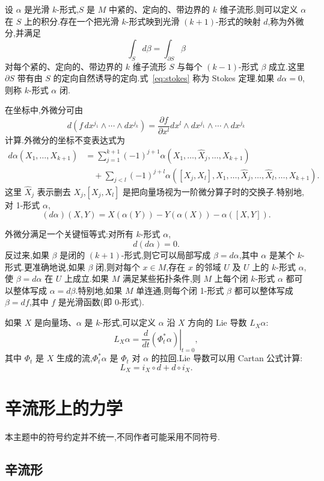 设 $\alpha$ 是光滑 $k$-形式,$S$ 是 $M$ 中紧的、定向的、带边界的 $k$ 维子流形,则可以定义 $\alpha$ 在 $S$ 上的积分.存在一个把光滑 $k$-形式映到光滑 $(k+1)$-形式的映射 $d$,称为外微分,并满足
\[
 \int_Sd\beta=\int_{\partial S}\beta\label{eq:stokes}
\]
对每个紧的、定向的、带边界的 $k$ 维子流形 $S$ 与每个 $(k-1)$-形式 $\beta$ 成立.这里 $\partial S$ 带有由 $S$ 的定向自然诱导的定向.式~\eqref{eq:stokes} 称为 Stokes 定理.如果 $d\alpha=0$,则称 $k$-形式 $\alpha$ 闭.

在坐标中,外微分可由
\[
 d(f\,dx^{j_1}\wedge\cdots\wedge dx^{j_k})
 =\frac{\partial f}{\partial x^l}
 dx^l\wedge dx^{j_1}\wedge\cdots\wedge dx^{j_k}
\]
计算.外微分的坐标不变表达式为
\[
\begin{aligned}
 d\alpha(X_1,\ldots,X_{k+1})
 &=\sum_{j=1}^{k+1}(-1)^{j+1}
 \alpha(X_1,\ldots,\widehat X_j,\ldots,X_{k+1})\\
 &\quad+\sum_{j<l}(-1)^{j+l}
 \alpha([X_j,X_l],X_1,\ldots,\widehat X_j,\ldots,
 \widehat X_l,\ldots,X_{k+1}).
\end{aligned}\label{eq:exterior-derivative}
\]
这里 $\widehat X_j$ 表示删去 $X_j$,$[X_j,X_l]$ 是把向量场视为一阶微分算子时的交换子.特别地,对 1-形式 $\alpha$,
\[
 (d\alpha)(X,Y)=X(\alpha(Y))-Y(\alpha(X))-\alpha([X,Y]).\label{eq:d-one-form}
\]

外微分满足一个关键恒等式:对所有 $k$-形式 $\alpha$,
\[
 d(d\alpha)=0.
\]
反过来,如果 $\beta$ 是闭的 $(k+1)$-形式,则它可以局部写成 $\beta=d\alpha$,其中 $\alpha$ 是某个 $k$-形式.更准确地说,如果 $\beta$ 闭,则对每个 $x\in M$,存在 $x$ 的邻域 $U$ 及 $U$ 上的 $k$-形式 $\alpha$,使 $\beta=d\alpha$ 在 $U$ 上成立.如果 $M$ 满足某些拓扑条件,则 $M$ 上每个闭 $k$-形式 $\alpha$ 都可以整体写成 $\alpha=d\beta$.特别地,如果 $M$ 单连通,则每个闭 1-形式 $\beta$ 都可以整体写成 $\beta=df$,其中 $f$ 是光滑函数(即 0-形式).

如果 $X$ 是向量场、$\alpha$ 是 $k$-形式,可以定义 $\alpha$ 沿 $X$ 方向的 Lie 导数 $L_X\alpha$:
\[
 L_X\alpha=\left.\frac d{dt}(\Phi_t^*\alpha)\right|_{t=0},
\]
其中 $\Phi_t$ 是 $X$ 生成的流,$\Phi_t^*\alpha$ 是 $\Phi_t$ 对 $\alpha$ 的拉回.Lie 导数可以用 Cartan 公式计算:
\[
 L_X=i_X\circ d+d\circ i_X.\label{eq:cartan-formula}
\]

\section{辛流形上的力学}
\label{sec:symplectic-mechanics}

本主题中的符号约定并不统一,不同作者可能采用不同符号.

\subsection{辛流形}
\label{subsec:symplectic-manifolds}

